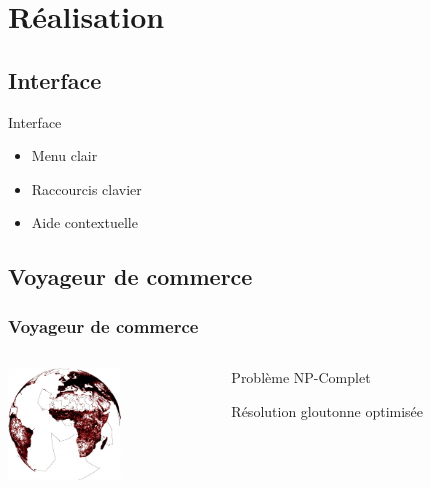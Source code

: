 \documentclass{beamer}
\begin{document}
\section{Réalisation}
    \subsection{Interface}
        \begin{frame}{Interface}
            \begin{itemize}
	            \item Menu clair
	            \item Raccourcis clavier
	            \item Aide contextuelle
            \end{itemize}
        \end{frame}
    \subsection{Voyageur de commerce}
    \begin{frame}
        \frametitle{Voyageur de commerce}
        \begin{columns}
            \begin{column}{0cm}
                \includegraphics[width=3cm]{images/wts.jpg}
            \end{column}
            \begin{column}{8cm}
                \begin{description}\itemsep15pt
                    \item Problème NP-Complet
                    \item Résolution gloutonne optimisée
                \end{description}
            \end{column}
        \end{columns}
    \end{frame}
\end{document}
